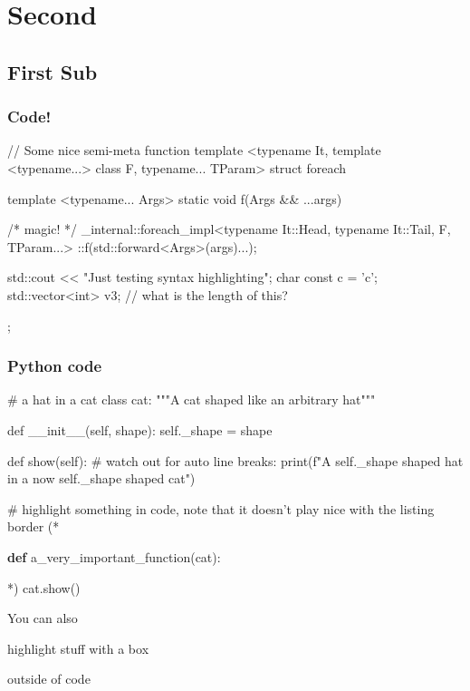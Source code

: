 \documentclass[mathserif, fleqn]{beamer}
\begin{document}
\section{Second}
\subsection{First Sub}
\begin{frame}[fragile]\frametitle{Code!}
  \begin{cppcode}[caption={A test \cpp listing}]
// Some nice semi-meta function
template <typename It,
          template <typename...> class F,
          typename... TParam>
struct foreach {
  template <typename... Args>
  static void f(Args && ...args) {
    /* magic! */
    _internal::foreach_impl<typename It::Head,
                            typename It::Tail,
                            F,
                            TParam...>
        ::f(std::forward<Args>(args)...);

    std::cout << "Just testing syntax highlighting\n";
    char const c = 'c';
    std::vector<int> v{3};  // what is the length of this?
  }
};
  \end{cppcode}
\end{frame}

\begin{frame}[fragile]\frametitle{{\dvfamily Python} code}
  \begin{pycode}[caption={Some Python as well}]
# a hat in a cat
class cat:
  """A cat shaped like an arbitrary hat"""

  def __init__(self, shape):
    self._shape = shape

  def show(self):
    # watch out for auto line breaks:
    print(f"A {self._shape} shaped hat in a now {self._shape} shaped cat")

# highlight something in code, note that it doesn't play nice with the listing border
(*\hspace{-1.5mm}\begin{highlightbox}{}{\bfseries\color{aiphiblue!75!white}def} a\_very\_important\_function(cat):\end{highlightbox}*)
  cat.show()
\end{pycode}

{\scriptsize
  You can also
  \begin{highlightbox}{}\sffamily
    highlight stuff with a box
  \end{highlightbox}
  outside of code
}
\end{frame}
\end{document}
